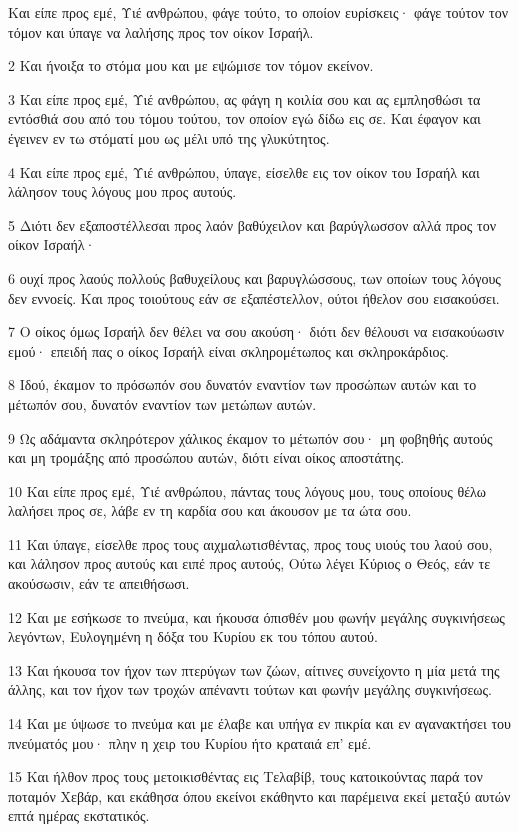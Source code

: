 \par Και είπε προς εμέ, Υιέ ανθρώπου, φάγε τούτο, το οποίον ευρίσκεις· φάγε τούτον τον τόμον και ύπαγε να λαλήσης προς τον οίκον Ισραήλ.
\par 2 Και ήνοιξα το στόμα μου και με εψώμισε τον τόμον εκείνον.
\par 3 Και είπε προς εμέ, Υιέ ανθρώπου, ας φάγη η κοιλία σου και ας εμπλησθώσι τα εντόσθιά σου από του τόμου τούτου, τον οποίον εγώ δίδω εις σε. Και έφαγον και έγεινεν εν τω στόματί μου ως μέλι υπό της γλυκύτητος.
\par 4 Και είπε προς εμέ, Υιέ ανθρώπου, ύπαγε, είσελθε εις τον οίκον του Ισραήλ και λάλησον τους λόγους μου προς αυτούς.
\par 5 Διότι δεν εξαποστέλλεσαι προς λαόν βαθύχειλον και βαρύγλωσσον αλλά προς τον οίκον Ισραήλ·
\par 6 ουχί προς λαούς πολλούς βαθυχείλους και βαρυγλώσσους, των οποίων τους λόγους δεν εννοείς. Και προς τοιούτους εάν σε εξαπέστελλον, ούτοι ήθελον σου εισακούσει.
\par 7 Ο οίκος όμως Ισραήλ δεν θέλει να σου ακούση· διότι δεν θέλουσι να εισακούωσιν εμού· επειδή πας ο οίκος Ισραήλ είναι σκληρομέτωπος και σκληροκάρδιος.
\par 8 Ιδού, έκαμον το πρόσωπόν σου δυνατόν εναντίον των προσώπων αυτών και το μέτωπόν σου, δυνατόν εναντίον των μετώπων αυτών.
\par 9 Ως αδάμαντα σκληρότερον χάλικος έκαμον το μέτωπόν σου· μη φοβηθής αυτούς και μη τρομάξης από προσώπου αυτών, διότι είναι οίκος αποστάτης.
\par 10 Και είπε προς εμέ, Υιέ ανθρώπου, πάντας τους λόγους μου, τους οποίους θέλω λαλήσει προς σε, λάβε εν τη καρδία σου και άκουσον με τα ώτα σου.
\par 11 Και ύπαγε, είσελθε προς τους αιχμαλωτισθέντας, προς τους υιούς του λαού σου, και λάλησον προς αυτούς και ειπέ προς αυτούς, Ούτω λέγει Κύριος ο Θεός, εάν τε ακούσωσιν, εάν τε απειθήσωσι.
\par 12 Και με εσήκωσε το πνεύμα, και ήκουσα όπισθέν μου φωνήν μεγάλης συγκινήσεως λεγόντων, Ευλογημένη η δόξα του Κυρίου εκ του τόπου αυτού.
\par 13 Και ήκουσα τον ήχον των πτερύγων των ζώων, αίτινες συνείχοντο η μία μετά της άλλης, και τον ήχον των τροχών απέναντι τούτων και φωνήν μεγάλης συγκινήσεως.
\par 14 Και με ύψωσε το πνεύμα και με έλαβε και υπήγα εν πικρία και εν αγανακτήσει του πνεύματός μου· πλην η χειρ του Κυρίου ήτο κραταιά επ' εμέ.
\par 15 Και ήλθον προς τους μετοικισθέντας εις Τελαβίβ, τους κατοικούντας παρά τον ποταμόν Χεβάρ, και εκάθησα όπου εκείνοι εκάθηντο και παρέμεινα εκεί μεταξύ αυτών επτά ημέρας εκστατικός.
